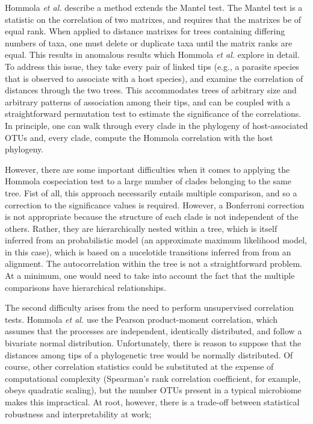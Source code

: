 Hommola {\em et al.} \cite{hommola2009permutation} describe a method extends the Mantel test. \cite{mantel1967detection} The Mantel test is a statistic on the correlation of two matrixes, and requires that the matrixes be of equal rank. When applied to distance matrixes for trees containing differing numbers of taxa, one must delete or duplicate taxa until the matrix ranks are equal. This results in anomalous results which Hommola {\em et al.} explore in detail. To address this issue, they take every pair of linked tips (e.g., a parasite species that is observed to associate with a host species), and examine the correlation of distances through the two trees. This accommodates trees of arbitrary size and arbitrary patterns of association among their tips, and can be coupled with a straightforward permutation test to estimate the significance of the correlations. In principle, one can walk through every clade in the phylogeny of host-associated OTUs and, every clade, compute the Hommola correlation with the host phylogeny. 



However, there are some important difficulties when it comes to applying the Hommola cospeciation test to a large number of clades belonging to the same tree. Fist of all, this approach necessarily entails multiple comparison, and so a correction to the significance values is required. However, a Bonferroni correction is not appropriate because the structure of each clade is not independent of the others. Rather, they are hierarchically nested within a tree, which is itself inferred from an probabilistic model (an approximate maximum likelihood model, in this case), which is based on a nucelotide transitions inferred from from an alignment. The autocorrelation within the tree is not a straightforward problem. At a minimum, one would need to take into account the fact that the multiple comparisons have hierarchical relationships.

The second difficulty arises from the need to perform unsupervised correlation tests. Hommola {\em et al.} use the Pearson product-moment correlation, which assumes that the processes are independent, identically distributed, and follow a bivariate normal distribution. Unfortunately, there is reason to suppose that the distances among tips of a phylogenetic tree would be normally distributed. Of course, other correlation statistics could be substituted at the expense of computational complexity (Spearman's rank correlation coefficient, for example, obeys quadratic scaling), but the number OTUs present in a typical microbiome makes this impractical. At root, however, there is a trade-off between statistical robustness and interpretability at work; 